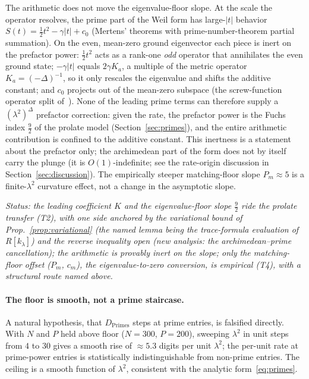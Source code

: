 \documentclass[11pt,a4paper]{article}
\begin{document}
The arithmetic does not move the eigenvalue-floor slope. At the scale the
operator resolves, the prime part of the Weil form has large-$|t|$ behavior
$S(t)=\tfrac12 t^2-\gamma|t|+c_0$ (Mertens' theorems with prime-number-theorem
partial summation). On the even, mean-zero ground eigenvector each piece is inert
on the prefactor power: $\tfrac12 t^2$ acts as a rank-one \emph{odd} operator that
annihilates the even ground state; $-\gamma|t|$ equals $2\gamma K_a$, a multiple of
the metric operator $K_a=(-\Delta)^{-1}$, so it only rescales the eigenvalue and
shifts the additive constant; and $c_0$ projects out of the mean-zero subspace
(the screw-function operator split of~\cite{Suzuki2026}). None of the leading
prime terms can therefore supply a $(\lambda^2)^\Delta$ prefactor correction:
given the rate, the prefactor power is the Fuchs index $\tfrac92$ of the prolate
model (Section~\ref{sec:primes}), and the entire arithmetic contribution is
confined to the additive constant. This inertness is a statement about the
prefactor only; the archimedean part of the form does not by itself carry the
plunge (it is $O(1)$-indefinite; see the rate-origin discussion in
Section~\ref{sec:discussion}). The empirically steeper
matching-floor slope $P_m\approx5$ is a finite-$\lambda^2$ curvature effect, not a
change in the asymptotic slope.

\emph{Status: the leading coefficient $K$ and the eigenvalue-floor slope $\tfrac92$
ride the prolate transfer (T2), with one side anchored by the variational bound
of Prop.~\ref{prop:variational} (the named lemma being the trace-formula
evaluation of $R[k_\lambda]$) and the reverse inequality open (new analysis:
the archimedean--prime cancellation); the arithmetic is provably inert on the
slope; only the matching-floor offset ($P_m$, $c_m$), the eigenvalue-to-zero
conversion, is empirical (T4), with a structural route named above.}

\paragraph{The floor is smooth, not a prime staircase.}
A natural hypothesis, that $D_{\mathrm{Primes}}$ steps at prime entries,
is falsified directly. With $N$ and $P$ held above floor ($N=300$, $P=200$),
sweeping $\lambda^2$ in unit steps from $4$ to $30$ gives a smooth rise of
$\approx5.3$ digits per unit $\lambda^2$; the per-unit rate at prime-power
entries is statistically indistinguishable from non-prime entries. The ceiling
is a smooth function of $\lambda^2$, consistent with the analytic
form~\eqref{eq:primes}.
\end{document}

